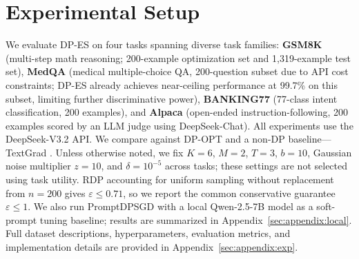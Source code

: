 \section{Experimental Setup}
\label{sec:experiments}

We evaluate DP-ES on four tasks spanning diverse task families: \textbf{GSM8K} \cite{cobbe2021training} (multi-step math reasoning; 200-example optimization set and 1,319-example test set), \textbf{MedQA} \cite{jin2021disease} (medical multiple-choice QA, 200-question subset due to API cost constraints; DP-ES already achieves near-ceiling performance at 99.7\% on this subset, limiting further discriminative power), \textbf{BANKING77} \cite{casanueva2020efficient} (77-class intent classification, 200 examples), and \textbf{Alpaca} \cite{taori2023alpaca} (open-ended instruction-following, 200 examples scored by an LLM judge using DeepSeek-Chat). All experiments use the DeepSeek-V3.2 \cite{liu2024deepseekv3} API. We compare against DP-OPT \cite{hong2024dpopt} and a non-DP baseline---TextGrad \cite{yuksekgonul2024textgrad}. Unless otherwise noted, we fix $K=6$, $M=2$, $T=3$, $b=10$, Gaussian noise multiplier $z=10$, and $\delta=10^{-5}$ across tasks; these settings are not selected using task utility. RDP accounting for uniform sampling without replacement from $n=200$ gives $\varepsilon\leq0.71$, so we report the common conservative guarantee $\varepsilon\leq1$. We also run PromptDPSGD with a local Qwen-2.5-7B model as a soft-prompt tuning baseline; results are summarized in Appendix~\ref{sec:appendix:local}. Full dataset descriptions, hyperparameters, evaluation metrics, and implementation details are provided in Appendix~\ref{sec:appendix:exp}.
